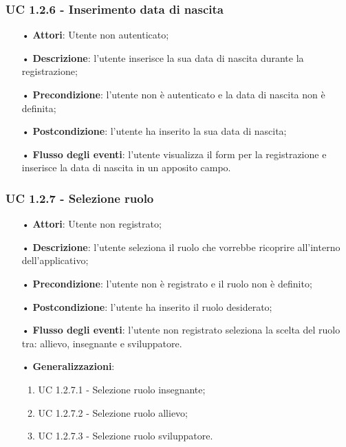 \subsubsection{UC 1.2.6 - Inserimento data di nascita}
\begin{itemize}
	\item[•]\textbf{Attori}: Utente non autenticato;
	\item[•]\textbf{Descrizione}: l'utente inserisce la sua data di nascita durante la registrazione;
	\item[•]\textbf{Precondizione}: l'utente non è autenticato e la data di nascita non è definita;
	\item[•]\textbf{Postcondizione}: l'utente ha inserito la sua data di nascita;
	\item[•]\textbf{Flusso degli eventi}: l'utente visualizza il form per la registrazione e inserisce la data di nascita in un apposito campo.
\end{itemize}

\subsubsection{UC 1.2.7 - Selezione ruolo}
\begin{itemize}
	\item[•]\textbf{Attori}: Utente non registrato;
	\item[•]\textbf{Descrizione}: l'utente seleziona il ruolo che vorrebbe ricoprire all'interno dell'applicativo;
	\item[•]\textbf{Precondizione}: l'utente non è registrato e il ruolo non è definito;
	\item[•]\textbf{Postcondizione}: l'utente ha inserito il ruolo desiderato;
	\item[•]\textbf{Flusso degli eventi}: l'utente non registrato seleziona la scelta del ruolo tra: allievo, insegnante e sviluppatore.
	\item[•]\textbf{Generalizzazioni}: 
	\begin{enumerate}
		\item UC 1.2.7.1 - Selezione ruolo insegnante;
		\item UC 1.2.7.2 - Selezione ruolo allievo;
		\item UC 1.2.7.3 - Selezione ruolo sviluppatore.
	\end{enumerate}
\end{itemize}

